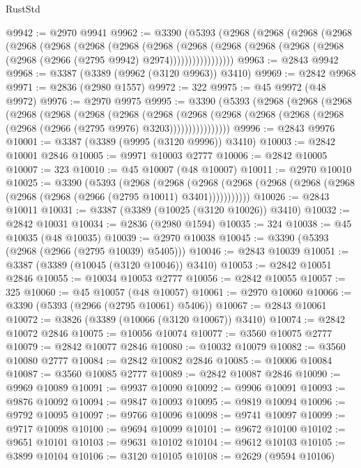 \begin{lexlean}{RustStd}
\begin{coremodule}
{\begin{coremodule}
{{{{{{{{{{{{{{{{{{{{{{{{{{{{{{{{{@9942 := @2970 @9941
@9962 := @3390
    (@5393
      (@2968
        (@2968
          (@2968
            (@2968
              (@2968
                (@2968
                  (@2968
                    (@2968
                      (@2968
                        (@2968
                          (@2968
                            (@2968 (@2968 (@2968 (@2968 (@2966 (@2795 @9942) @2974)))))))))))))))))
@9963 := @2843 @9942
@9968 := @3387 (@3389 (@9962 (@3120 @9963)) @3410)
@9969 := @2842 @9968
@9971 := @2836 (@2980 @1557)
@9972 := 322
@9975 := @45 @9972 (@48 @9972)
@9976 := @2970 @9975
@9995 := @3390
    (@5393
      (@2968
        (@2968
          (@2968
            (@2968
              (@2968
                (@2968
                  (@2968
                    (@2968
                      (@2968
                        (@2968
                          (@2968 (@2968 (@2968 (@2968 (@2966 (@2795 @9976) @3203))))))))))))))))
@9996 := @2843 @9976
@10001 := @3387 (@3389 (@9995 (@3120 @9996)) @3410)
@10003 := @2842 @10001 @2846
@10005 := @9971 @10003 @2777
@10006 := @2842 @10005
@10007 := 323
@10010 := @45 @10007 (@48 @10007)
@10011 := @2970 @10010
@10025 := @3390
    (@5393
      (@2968
        (@2968
          (@2968 (@2968 (@2968 (@2968 (@2968 (@2968 (@2968 (@2966 (@2795 @10011) @3401)))))))))))
@10026 := @2843 @10011
@10031 := @3387 (@3389 (@10025 (@3120 @10026)) @3410)
@10032 := @2842 @10031
@10034 := @2836 (@2980 @1594)
@10035 := 324
@10038 := @45 @10035 (@48 @10035)
@10039 := @2970 @10038
@10045 := @3390 (@5393 (@2968 (@2966 (@2795 @10039) @5405)))
@10046 := @2843 @10039
@10051 := @3387 (@3389 (@10045 (@3120 @10046)) @3410)
@10053 := @2842 @10051 @2846
@10055 := @10034 @10053 @2777
@10056 := @2842 @10055
@10057 := 325
@10060 := @45 @10057 (@48 @10057)
@10061 := @2970 @10060
@10066 := @3390 (@5393 (@2966 (@2795 @10061) @5406))
@10067 := @2843 @10061
@10072 := @3826 (@3389 (@10066 (@3120 @10067)) @3410)
@10074 := @2842 @10072 @2846
@10075 := @10056 @10074
@10077 := @3560 @10075 @2777
@10079 := @2842 @10077 @2846
@10080 := @10032 @10079
@10082 := @3560 @10080 @2777
@10084 := @2842 @10082 @2846
@10085 := @10006 @10084
@10087 := @3560 @10085 @2777
@10089 := @2842 @10087 @2846
@10090 := @9969 @10089
@10091 := @9937 @10090
@10092 := @9906 @10091
@10093 := @9876 @10092
@10094 := @9847 @10093
@10095 := @9819 @10094
@10096 := @9792 @10095
@10097 := @9766 @10096
@10098 := @9741 @10097
@10099 := @9717 @10098
@10100 := @9694 @10099
@10101 := @9672 @10100
@10102 := @9651 @10101
@10103 := @9631 @10102
@10104 := @9612 @10103
@10105 := @3899 @10104
@10106 := @3120 @10105
@10108 := @2629 (@9594 @10106)
}}}}}}}}}}}}}}}}}}}}}}}}}}}}}}}}}
\end{coremodule}}
\end{coremodule}
\end{lexlean}
